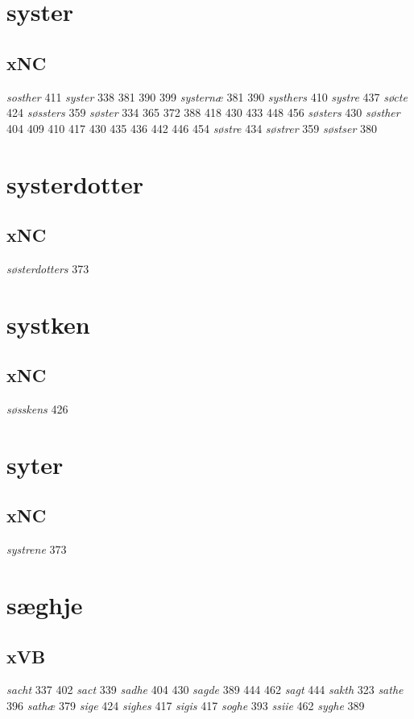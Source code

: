 \documentclass[a4paper,twocolumn]{article}
\begin{document}
\section{syster}
\label{sec:orgd223d2c}
\subsection{xNC}
\label{sec:org3cf7861}
\emph{sosther} 411 \emph{syster} 338 381 390 399 \emph{systernæ} 381 390 \emph{systhers} 410 \emph{systre} 437 \emph{søcte} 424 \emph{søssters} 359 \emph{søster} 334 365 372 388 418 430 433 448 456 \emph{søsters} 430 \emph{søsther} 404 409 410 417 430 435 436 442 446 454 \emph{søstre} 434 \emph{søstrer} 359 \emph{søstser} 380 
\section{systerdotter}
\label{sec:org8a30abe}
\subsection{xNC}
\label{sec:orgcae69ce}
\emph{søsterdotters} 373 
\section{systken}
\label{sec:org7d32723}
\subsection{xNC}
\label{sec:org0927a22}
\emph{søsskens} 426 
\section{syter}
\label{sec:org0842cb8}
\subsection{xNC}
\label{sec:org4a79665}
\emph{systrene} 373 
\section{sæghje}
\label{sec:orgb5386da}
\subsection{xVB}
\label{sec:org46162cf}
\emph{sacht} 337 402 \emph{sact} 339 \emph{sadhe} 404 430 \emph{sagde} 389 444 462 \emph{sagt} 444 \emph{sakth} 323 \emph{sathe} 396 \emph{sathæ} 379 \emph{sige} 424 \emph{sighes} 417 \emph{sigis} 417 \emph{soghe} 393 \emph{ssiie} 462 \emph{syghe} 389 
\end{document}
